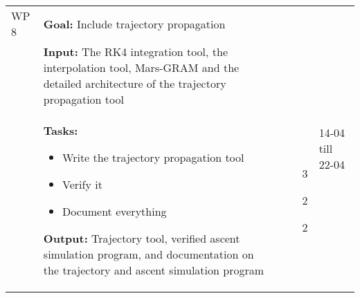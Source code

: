 \begin{longtable}{|p{2cm}|p{10cm}|p{1cm}|p{1cm}|}
WP 8 & \textbf{Goal:} Include trajectory propagation &  & \multirow{3}{1cm}{14-04 till 22-04}   \\ 
&\textbf{Input:} The \ac{RK4} integration tool, the interpolation tool, Mars-\ac{GRAM} and the detailed architecture of the trajectory propagation tool & & \\
& \textbf{Tasks:}
\begin{itemize}
\item Write the trajectory propagation tool
\item Verify it
\item Document everything
\end{itemize} 
\textbf{Output:} Trajectory tool, verified ascent simulation program, and documentation on the trajectory and ascent simulation program & \noindent \begin{itemize}[leftmargin=*]
\item[3] 
\item[2]
\item[2]
\end{itemize} & \\ \hline
%

\end{longtable}

